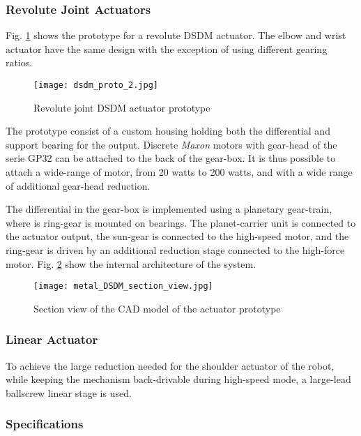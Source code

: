 \subsubsection{Revolute Joint Actuators}

Fig. \ref{fig:dsdm_act} shows the prototype for a revolute DSDM actuator. The elbow and wrist actuator have the same design with the exception of using different gearing ratios.

\begin{figure}[htp]
	\centering
		\texttt{[image: dsdm\_proto\_2.jpg]}
	\caption{Revolute joint DSDM actuator prototype } %
	\label{fig:dsdm_act}
\end{figure}

The prototype consist of a custom housing holding both the differential and support bearing for the output. Discrete \textit{Maxon} motors with gear-head of the serie GP32 can be attached to the back of the gear-box. It is thus possible to attach a wide-range of motor, from 20 watts to 200 watts, and with a wide range of additional gear-head reduction. 

The differential in the gear-box is implemented using a planetary gear-train, where is ring-gear is mounted on bearings. The planet-carrier unit is connected to the actuator output, the sun-gear is connected to the high-speed motor, and the ring-gear is driven by an additional reduction stage connected to the high-force motor. Fig. \ref{fig:dsdm_section} show the internal architecture of the system.


\begin{figure}[htp]
	\centering
		\texttt{[image: metal\_DSDM\_section\_view.jpg]}
	\caption{Section view of the CAD model of the actuator prototype} %
	\label{fig:dsdm_section}
\end{figure}


\subsubsection{Linear Actuator}

To achieve the large reduction needed for the shoulder actuator of the robot, while keeping the mechanism back-drivable during high-speed mode, a large-lead ballscrew linear stage is used. 


\subsubsection{Specifications}




